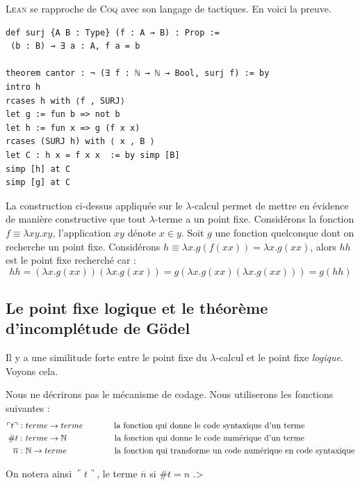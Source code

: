 \vspace{.5cm}

\textsc{Lean} se rapproche de \textsc{Coq} avec son langage de tactiques. En voici la preuve.
\begin{verbatim}
def surj {A B : Type} (f : A → B) : Prop :=
 (b : B) → ∃ a : A, f a = b

theorem cantor : ¬ (∃ f : ℕ → ℕ → Bool, surj f) := by
intro h
rcases h with ⟨f , SURJ⟩
let g := fun b => not b
let h := fun x => g (f x x)
rcases (SURJ h) with ⟨ x , B ⟩
let C : h x = f x x  := by simp [B]
simp [h] at C
simp [g] at C
\end{verbatim}

La construction ci-dessus appliquée sur le $\lambda$-calcul permet de mettre en évidence de 
manière constructive que tout $\lambda$-terme a un point fixe.
Considérons la fonction $f \equiv \lambda xy.xy$, l'application $xy$ dénote $x \in y$.
Soit $g$ une fonction quelconque dont on recherche un point fixe.
Considérons $h\equiv \lambda x.g(f (x x))=\lambda x.g(x x)$, alors $h h$ est 
le point fixe recherché car :
$$
hh=(\lambda x.g(xx))(\lambda x.g(xx))=g(\lambda x.g(xx)(\lambda x.g(xx)))=g(hh)
$$

\subsection{Le point fixe logique et le théorème d'incomplétude de Gödel} %
Il y a une similitude forte entre le point fixe du $\lambda$-calcul et le point fixe \textit{logique}. Voyons cela.

Nous ne décrirons pas le mécanisme de codage. 
Nous utiliserons les fonctions suivantes :
\begin{align*}
\ulcorner t  \urcorner :& \  terme \rightarrow terme \hspace{1.3cm} \text{la fonction qui donne le code syntaxique d'un terme}\\
\#  t :& \  terme \rightarrow \mathbb{N} \hspace{2cm} \text{la fonction qui donne le code numérique d'un terme}\\
\overline{  n } :& \  \mathbb{N} \rightarrow terme \hspace{2cm}  \text{la fonction qui transforme un code numérique
 en code syntaxique}
\end{align*}

On notera ainsi $\ulcorner t \urcorner$, le terme $\overline{n}$  si 
$\# t =n$ .> 


